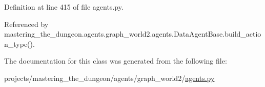 Definition at line 415 of file agents.\+py.



Referenced by mastering\+\_\+the\+\_\+dungeon.\+agents.\+graph\+\_\+world2.\+agents.\+Data\+Agent\+Base.\+build\+\_\+action\+\_\+type().



The documentation for this class was generated from the following file\+:\begin{DoxyCompactItemize}
\item 
projects/mastering\+\_\+the\+\_\+dungeon/agents/graph\+\_\+world2/\hyperlink{projects_2mastering__the__dungeon_2agents_2graph__world2_2agents_8py}{agents.\+py}\end{DoxyCompactItemize}
